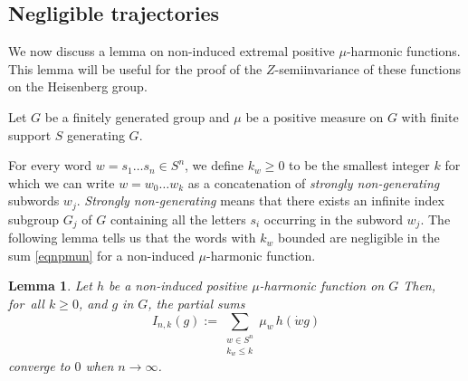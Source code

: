 \documentclass[11pt]{article}
\numberwithin{equation}{section}
\newtheorem{Lem}[Thm]{Lemma}
\theoremstyle{definition}
\let\bq\relax
\let\eq\relax
\let\ra\to
\begin{document}
\subsection{Negligible trajectories}
\label{secnegtra}
\bq
We now discuss a lemma on non-induced extre\-mal positive $\mu$-harmonic functions.
This lemma will be useful for the proof of the $Z$\nobreakdash-semiinvariance
of these functions on the Heisenberg group.
\eq

Let $G$ be a finitely generated group
and $\mu$ be a positive measure on $G$ with finite support $S$
generating $G$.

For every word $w=s_1\ldots s_n\in S^n$, we define
$k_w\geq 0 $ to be the smallest integer $k$ for which we can
write $w=w_0\ldots w_k$ as a concatenation of \emph{strongly non-generating} subwords $w_j$.
\emph{Strongly non-generating} means that
there exists an infinite index subgroup $G_j$ of $G$
containing all the letters $s_i$ occurring
in the subword $w_j$.
The following lemma tells us that the words with $k_w$ bounded
are negligible
in the sum \eqref{eqnpmun} for a non-induced $\mu$-harmonic function.

\begin{Lem}
\label{lemnegtra}
Let $h$ be a non-induced positive $\mu$-harmonic function on $G$
Then, for~all $k\geq 0$, and $g$ in $G$, the partial sums
\begin{equation}
\label{eqnlimsumhgg}
I_{n,k}(g):=\sum_{\substack{w\in S^n\\ k_w\leq k}} \mu_w\, h(\dot{w}g)
\end{equation}
converge to $0$ when $n\ra\infty$.
\end{Lem}
\end{document}

